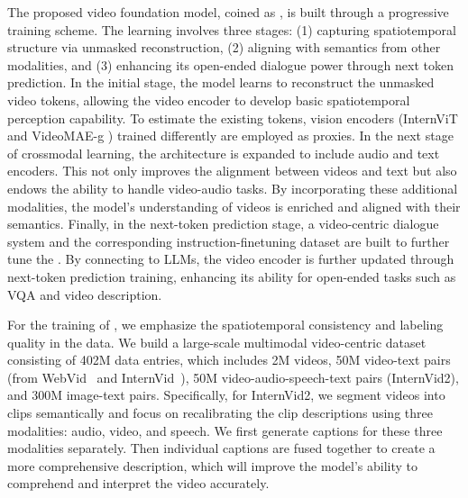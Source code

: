 The proposed video foundation model, coined as {\modelname}, is built through a progressive training scheme. The learning involves three stages: (1) capturing spatiotemporal structure via unmasked reconstruction, (2) aligning with semantics from other modalities, and (3) enhancing its open-ended dialogue power through next token prediction.
In the initial stage, the model learns to reconstruct the unmasked video tokens, allowing the video encoder to develop basic spatiotemporal perception capability. To estimate the existing tokens, vision encoders (InternViT \cite{chen2023internvl} and VideoMAE-g \cite{wang2023videomae}) trained differently are employed as proxies.
In the next stage of crossmodal learning, the architecture is expanded to include audio and text encoders. This not only improves the alignment between videos and text but also endows {\modelname} the ability to handle video-audio tasks. By incorporating these additional modalities, the model's understanding of videos is enriched and aligned with their semantics.
Finally, in the next-token prediction stage, a video-centric dialogue system and the corresponding instruction-finetuning dataset are built to further tune the {\modelname}. By connecting {\modelname} to LLMs, the video encoder is further updated through next-token prediction training, enhancing its ability for open-ended tasks such as VQA and video description. 

For the training of {\modelname}, we emphasize the spatiotemporal consistency and labeling quality in the data. We build a large-scale multimodal video-centric dataset consisting of 402M data entries, which includes 2M videos, 50M video-text pairs (from WebVid~\cite{webvid} and InternVid~\cite{wang2023internvid}), 50M video-audio-speech-text pairs (InternVid2), and 300M image-text pairs.
Specifically, for InternVid2, we segment videos into clips semantically and focus on recalibrating the clip descriptions using three modalities: audio, video, and speech. We first generate captions for these three modalities separately. Then individual captions are fused together to create a more comprehensive description, which will improve the model's ability to comprehend and interpret the video accurately.

